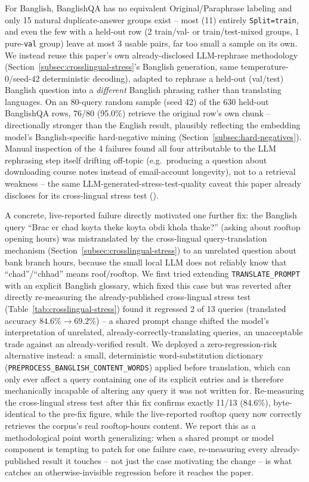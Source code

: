 \documentclass[a4paper,twoside]{article}
\begin{document}
For Banglish, BanglishQA has no equivalent Original/Paraphrase labeling and only 15 natural duplicate-answer groups exist -- most (11) entirely \texttt{Split=train}, and even the few with a held-out row (2 train/val- or train/test-mixed groups, 1 pure-\texttt{val} group) leave at most 3 usable pairs, far too small a sample on its own. We instead reuse this paper's own already-disclosed LLM-rephrase methodology (Section~\ref{subsec:crosslingual-stress}'s Banglish generation, same temperature-0/seed-42 deterministic decoding), adapted to rephrase a held-out (val/test) Banglish question into a \emph{different} Banglish phrasing rather than translating languages. On an 80-query random sample (seed 42) of the 630 held-out BanglishQA rows, 76/80 (95.0\%) retrieve the original row's own chunk -- directionally stronger than the English result, plausibly reflecting the embedding model's Banglish-specific hard-negative mining (Section~\ref{subsec:hard-negatives}). Manual inspection of the 4 failures found all four attributable to the LLM rephrasing step itself drifting off-topic (e.g.\ producing a question about downloading course notes instead of email-account longevity), not to a retrieval weakness -- the same LLM-generated-stress-test-quality caveat this paper already discloses for its cross-lingual stress test (\citet{dogruoz2023representativeness}).

A concrete, live-reported failure directly motivated one further fix: the Banglish query ``Brac er chad koyta theke koyta obdi khola thake?'' (asking about rooftop opening hours) was mistranslated by the cross-lingual query-translation mechanism (Section~\ref{subsec:crosslingual-stress}) to an unrelated question about bank branch hours, because the small local LLM does not reliably know that ``chad''/``chhad'' means roof/rooftop. We first tried extending \texttt{TRANSLATE\_PROMPT} with an explicit Banglish glossary, which fixed this case but was reverted after directly re-measuring the already-published cross-lingual stress test (Table~\ref{tab:crosslingual-stress}) found it regressed 2 of 13 queries (translated accuracy $84.6\%\to69.2\%$) -- a shared prompt change shifted the model's interpretation of unrelated, already-correctly-translating queries, an unacceptable trade against an already-verified result. We deployed a zero-regression-risk alternative instead: a small, deterministic word-substitution dictionary (\texttt{PREPROCESS\_BANGLISH\_CONTENT\_WORDS}) applied before translation, which can only ever affect a query containing one of its explicit entries and is therefore mechanically incapable of altering any query it was not written for. Re-measuring the cross-lingual stress test after this fix confirms exactly 11/13 (84.6\%), byte-identical to the pre-fix figure, while the live-reported rooftop query now correctly retrieves the corpus's real rooftop-hours content. We report this as a methodological point worth generalizing: when a shared prompt or model component is tempting to patch for one failure case, re-measuring every already-published result it touches -- not just the case motivating the change -- is what catches an otherwise-invisible regression before it reaches the paper.
\end{document}
